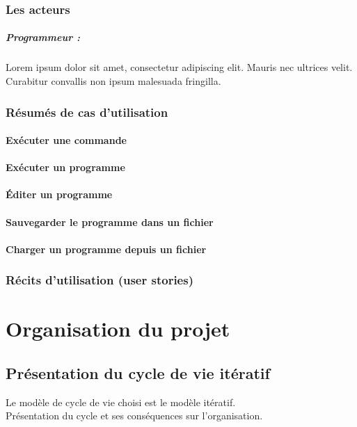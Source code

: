 \documentclass[11pt,a4paper,titlepage,openright]{report}
\begin{document}
    \subsection{Les acteurs}
    \paragraph{Programmeur :} %
    Lorem ipsum dolor sit amet, consectetur adipiscing elit. Mauris nec ultrices velit. Curabitur convallis non ipsum malesuada fringilla.

    \subsection{Résumés de cas d'utilisation}
    \subsubsection{Exécuter une commande}
    \subsubsection{Exécuter un programme}
    \subsubsection{Éditer un programme}
    \subsubsection{Sauvegarder le programme dans un fichier}
    \subsubsection{Charger un programme depuis un fichier}


    \subsection{Récits d'utilisation (user stories)}


    \chapter{Organisation du projet}
    \section{Présentation du cycle de vie itératif} %
    Le modèle de cycle de vie choisi est le modèle itératif.
    \\Présentation du cycle et ses conséquences sur l’organisation.
\end{document}
